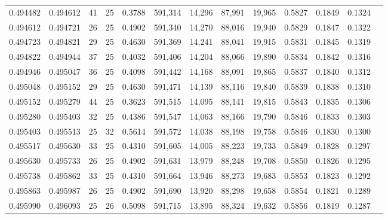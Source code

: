 \begin{tabular}{rrrrrrrrrrrrr}
0.494482 & 0.494612 &    41 &  25 &                                     0.3788 & 591,314 &  14,296 &  87,991 &  19,965 & 0.5827 & 0.1849 & 0.1324 \\
0.494612 & 0.494721 &    26 &  25 &                                     0.4902 & 591,340 &  14,270 &  88,016 &  19,940 & 0.5829 & 0.1847 & 0.1322 \\
0.494723 & 0.494821 &    29 &  25 &                                     0.4630 & 591,369 &  14,241 &  88,041 &  19,915 & 0.5831 & 0.1845 & 0.1319 \\
0.494822 & 0.494944 &    37 &  25 &                                     0.4032 & 591,406 &  14,204 &  88,066 &  19,890 & 0.5834 & 0.1842 & 0.1316 \\
0.494946 & 0.495047 &    36 &  25 &                                     0.4098 & 591,442 &  14,168 &  88,091 &  19,865 & 0.5837 & 0.1840 & 0.1312 \\
0.495048 & 0.495152 &    29 &  25 &                                     0.4630 & 591,471 &  14,139 &  88,116 &  19,840 & 0.5839 & 0.1838 & 0.1310 \\
0.495152 & 0.495279 &    44 &  25 &                                     0.3623 & 591,515 &  14,095 &  88,141 &  19,815 & 0.5843 & 0.1835 & 0.1306 \\
0.495280 & 0.495403 &    32 &  25 &                                     0.4386 & 591,547 &  14,063 &  88,166 &  19,790 & 0.5846 & 0.1833 & 0.1303 \\
0.495403 & 0.495513 &    25 &  32 &                                     0.5614 & 591,572 &  14,038 &  88,198 &  19,758 & 0.5846 & 0.1830 & 0.1300 \\
0.495517 & 0.495630 &    33 &  25 &                                     0.4310 & 591,605 &  14,005 &  88,223 &  19,733 & 0.5849 & 0.1828 & 0.1297 \\
0.495630 & 0.495733 &    26 &  25 &                                     0.4902 & 591,631 &  13,979 &  88,248 &  19,708 & 0.5850 & 0.1826 & 0.1295 \\
0.495738 & 0.495862 &    33 &  25 &                                     0.4310 & 591,664 &  13,946 &  88,273 &  19,683 & 0.5853 & 0.1823 & 0.1292 \\
0.495863 & 0.495987 &    26 &  25 &                                     0.4902 & 591,690 &  13,920 &  88,298 &  19,658 & 0.5854 & 0.1821 & 0.1289 \\
0.495990 & 0.496093 &    25 &  26 &                                     0.5098 & 591,715 &  13,895 &  88,324 &  19,632 & 0.5856 & 0.1819 & 0.1287 \\

\end{tabular}
